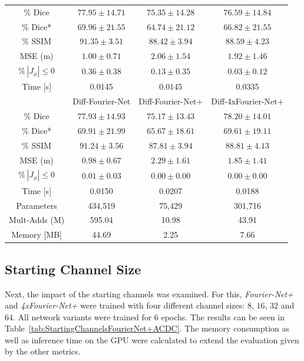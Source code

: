 \documentclass[english,version-2022-01]{uzl-thesis} %
\begin{document}
\begin{table}[H]
\begin{tabular}{c c c c}
		\midrule
		$\%$ Dice & $77.95 \pm 14.71$ & $75.35 \pm 14.28$ & $76.59 \pm 14.84$\\
		$\%$ Dice* & $69.96 \pm 21.55$ & $64.74 \pm 21.12$ & $66.82 \pm 21.55$ \\
		$\%$ SSIM & $91.35 \pm 3.51$ & $88.42 \pm 3.94$ & $88.59 \pm 4.23$\\
		MSE (m) & $1.00 \pm 0.71$ & $2.06 \pm 1.54$ & $1.92 \pm 1.46$ \\
		$\% \, |J_{\phi}|\leq0$ & $0.36 \pm 0.38$ & $0.13 \pm 0.35$ & $0.03 \pm 0.12$ \\
		Time [s] & 0.0145 & 0.0145 & 0.0335 \\
		\midrule
		 & Diff-Fourier-Net & Diff-Fourier-Net+ & Diff-4xFourier-Net+\\		
		\midrule
		$\%$ Dice & $77.93 \pm 14.93$ & $75.17 \pm 13.43$ & $78.20 \pm 14.01$\\
		$\%$ Dice* & $69.91 \pm 21.99$ & $65.67 \pm 18.61$ & $69.61 \pm 19.11$ \\
		$\%$ SSIM & $91.24 \pm 3.56$ & $87.81 \pm 3.94$ & $88.81 \pm 4.13$\\
		MSE (m) & $0.98 \pm 0.67$ & $2.29 \pm 1.61$ & $1.85 \pm 1.41$ \\
		$\% \, |J_{\phi}|\leq0$ & $0.01 \pm 0.03$ & $0.00 \pm 0.00$ & $0.00 \pm 0.00$ \\
		Time [s] 	  & 0.0150  & 0.0207 & 0.0188 \\
		\midrule
		Parameters    & 434,519 & 75,429 & 301,716 \\
		Mult-Adds (M) & 595.04  & 10.98  & 43.91 \\
		Memory [MB]   & 44.69   & 2.25   & 7.66 \\
		\bottomrule
	\end{tabular}	
\end{table}


\subsection{Starting Channel Size} \label{SubSec:ResultsStartingChannelsACDC}
Next, the impact of the starting channels was examined. For this, \emph{Fourier-Net+} and \emph{4xFourier-Net+} were trained with four different channel sizes: $8$, $16$, $32$ and $64$. All network variants were trained for 6 epochs. The results can be seen in Table~\ref{tab:StartingChannelsFourierNet+ACDC}. The memory consumption as well as inference time on the GPU were calculated to extend the evaluation given by the other metrics.
\end{document}

